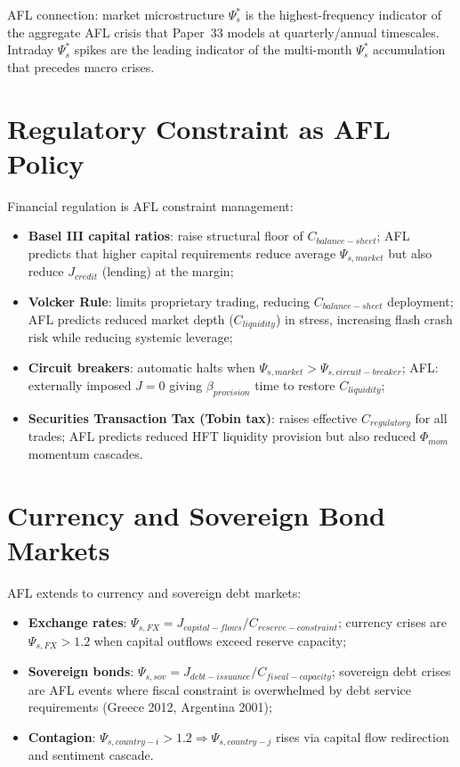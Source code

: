 \documentclass[11pt]{article}
\begin{document}
AFL connection: market microstructure $\Psi_s^*$ is the highest-frequency indicator of the aggregate
AFL crisis that Paper~33 models at quarterly/annual timescales. Intraday $\Psi_s^*$ spikes are
the leading indicator of the multi-month $\Psi_s^*$ accumulation that precedes macro crises.

\section{Regulatory Constraint as AFL Policy}

Financial regulation is AFL constraint management:
\begin{itemize}
    \item \textbf{Basel III capital ratios}: raise structural floor of $C_{balance-sheet}$;
          AFL predicts that higher capital requirements reduce average $\Psi_{s,market}$ but also
          reduce $J_{credit}$ (lending) at the margin;
    \item \textbf{Volcker Rule}: limits proprietary trading, reducing $C_{balance-sheet}$
          deployment; AFL predicts reduced market depth ($C_{liquidity}$) in stress, increasing
          flash crash risk while reducing systemic leverage;
    \item \textbf{Circuit breakers}: automatic halts when $\Psi_{s,market} > \Psi_{s,circuit-breaker}$;
          AFL: externally imposed $J = 0$ giving $\beta_{provision}$ time to restore $C_{liquidity}$;
    \item \textbf{Securities Transaction Tax (Tobin tax)}: raises effective $C_{regulatory}$ for
          all trades; AFL predicts reduced HFT liquidity provision but also reduced $\Phi_{mom}$
          momentum cascades.
\end{itemize}

\section{Currency and Sovereign Bond Markets}

AFL extends to currency and sovereign debt markets:
\begin{itemize}
    \item \textbf{Exchange rates}: $\Psi_{s,FX} = J_{capital-flows} / C_{reserve-constraint}$;
          currency crises are $\Psi_{s,FX} > 1.2$ when capital outflows exceed reserve capacity;
    \item \textbf{Sovereign bonds}: $\Psi_{s,sov} = J_{debt-issuance} / C_{fiscal-capacity}$;
          sovereign debt crises are AFL events where fiscal constraint is overwhelmed by debt
          service requirements (Greece 2012, Argentina 2001);
    \item \textbf{Contagion}: $\Psi_{s,country-i} > 1.2 \Rightarrow \Psi_{s,country-j}$ rises via
          capital flow redirection and sentiment cascade.
\end{itemize}
\end{document}
